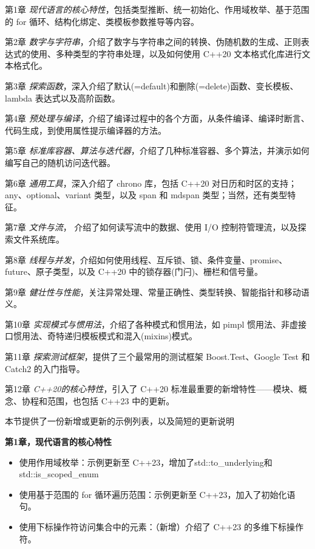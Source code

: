 
第1章 \textit{现代语言的核心特性}，包括类型推断、统一初始化、作用域枚举、基于范围的 for 循环、结构化绑定、类模板参数推导等内容。

第2章 \textit{数字与字符串}，介绍了数字与字符串之间的转换、伪随机数的生成、正则表达式的使用、多种类型的字符串处理，以及如何使用 C++20 文本格式化库进行文本格式化。

第3章 \textit{探索函数}，深入介绍了默认(=default)和删除(=delete)函数、变长模板、lambda 表达式以及高阶函数。

第4章 \textit{预处理与编译}，介绍了编译过程中的各个方面，从条件编译、编译时断言、代码生成，到使用属性提示编译器的方法。

第5章 \textit{标准库容器、算法与迭代器}，介绍了几种标准容器、多个算法，并演示如何编写自己的随机访问迭代器。

第6章 \textit{通用工具}，深入介绍了 chrono 库，包括 C++20 对日历和时区的支持；any、optional、variant 类型，以及 span 和 mdspan 类型；当然，还有类型特征。

第7章 \textit{文件与流}， 介绍了如何读写流中的数据、使用 I/O 控制符管理流，以及探索文件系统库。

第8章 \textit{线程与并发}，介绍如何使用线程、互斥锁、锁、条件变量、promise、future、原子类型，以及 C++20 中的锁存器(门闩)、栅栏和信号量。

第9章 \textit{健壮性与性能}，关注异常处理、常量正确性、类型转换、智能指针和移动语义。

第10章 \textit{实现模式与惯用法}，介绍了各种模式和惯用法，如 pimpl 惯用法、非虚接口惯用法、奇特递归模板模式和混入(mixins)模式。

第11章 \textit{探索测试框架}，提供了三个最常用的测试框架 Boost.Test、Google Test 和 Catch2 的入门指导。

第12章 \textit{C++20的核心特性}，引入了 C++20 标准最重要的新增特性——模块、概念、协程和范围，也包括 C++23 中的更新。


本节提供了一份新增或更新的示例列表，以及简短的更新说明

\textbf{第1章，现代语言的核心特性}

\begin{itemize}
\item
使用作用域枚举：示例更新至 C++23，增加了std::to\_underlying和std::is\_scoped\_enum

\item
使用基于范围的 for 循环遍历范围：示例更新至 C++23，加入了初始化语句。

\item
使用下标操作符访问集合中的元素：（新增）介绍了 C++23 的多维下标操作符。
\end{itemize}

